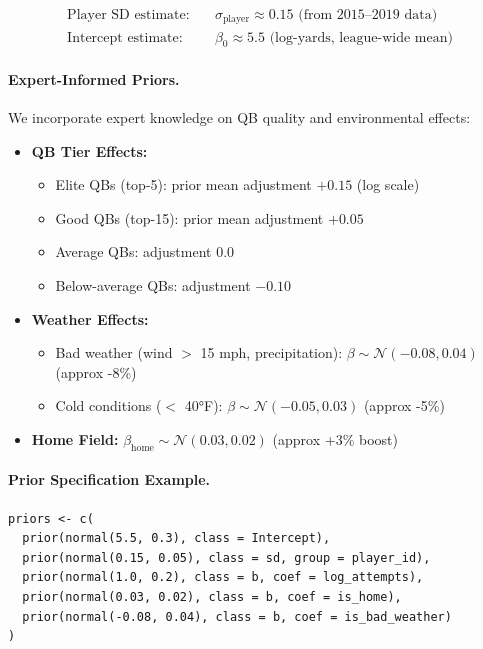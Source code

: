 \documentclass[12pt]{report}  %
\numberwithin{equation}{section}
\theoremstyle{plain}
\theoremstyle{definition}
\theoremstyle{remark}
\begin{document}
\begin{align}
\text{Player SD estimate:} &\quad \sigma_{\text{player}} \approx 0.15 \text{ (from 2015--2019 data)} \\
\text{Intercept estimate:} &\quad \beta_0 \approx 5.5 \text{ (log-yards, league-wide mean)}
\end{align}

\paragraph{Expert-Informed Priors.}
We incorporate expert knowledge on QB quality and environmental effects:

\begin{itemize}
  \item \textbf{QB Tier Effects:}
    \begin{itemize}
      \item Elite QBs (top-5): prior mean adjustment $+0.15$ (log scale)
      \item Good QBs (top-15): prior mean adjustment $+0.05$
      \item Average QBs: adjustment $0.0$
      \item Below-average QBs: adjustment $-0.10$
    \end{itemize}
  \item \textbf{Weather Effects:}
    \begin{itemize}
      \item Bad weather (wind $>$ 15 mph, precipitation): $\beta \sim \mathcal{N}(-0.08, 0.04)$ (approx -8\%)
      \item Cold conditions ($<$ 40°F): $\beta \sim \mathcal{N}(-0.05, 0.03)$ (approx -5\%)
    \end{itemize}
  \item \textbf{Home Field:} $\beta_{\text{home}} \sim \mathcal{N}(0.03, 0.02)$ (approx +3\% boost)
\end{itemize}

\paragraph{Prior Specification Example.}
\begin{verbatim}
priors <- c(
  prior(normal(5.5, 0.3), class = Intercept),
  prior(normal(0.15, 0.05), class = sd, group = player_id),
  prior(normal(1.0, 0.2), class = b, coef = log_attempts),
  prior(normal(0.03, 0.02), class = b, coef = is_home),
  prior(normal(-0.08, 0.04), class = b, coef = is_bad_weather)
)
\end{verbatim}
\end{document}
